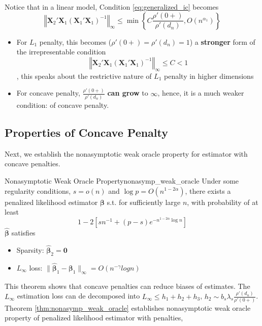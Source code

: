 \documentclass[twoside]{article}
\begin{document}
Notice that in a linear model, Condition \ref{eq:generalized_ic} becomes 
$$
\left\Vert \mathbf{X}_2' \mathbf{X}_1 \left(\mathbf{X}_1'\mathbf{X}_1\right)^{-1} \right\Vert _{\infty} \leq \min \left\{ C\frac{\rho'(0+)}{\rho'(d_n)}, O(n^{\alpha_1})\right\}
$$
\begin{itemize}
    \item For $L_1$ penalty, this becomes ($\rho'(0+)=\rho'(d_n)=1$) a \textbf{stronger} form of the irrepresentable condition $$ \left\Vert \mathbf{X}_2' \mathbf{X}_1 \left(\mathbf{X}_1'\mathbf{X}_1\right)^{-1} \right\Vert _{\infty} \leq C <1 $$, this speaks about the restrictive nature of $L_1$ penalty in higher dimensions
    \item For concave penalty, $\frac{\rho'(0+)}{\rho'(d_n)}$ \textbf{can grow} to $\infty$, hence, it is a much weaker condition:  of concave penalty.
\end{itemize}

\subsection{Properties of Concave Penalty}
Next, we establish the nonasymptotic weak oracle property for estimator with concave penalties.
\begin{theorem}{Nonasymptotic Weak Oracle Property}{nonasymp_weak_oracle}
    Under some regularity conditions, $s=o(n)$ and $\log p=O(n^{1-2\alpha})$, there exists a penalized likelihood estimator $\boldsymbol{\beta}$ s.t. for sufficiently large $n$, with probability of at least $$ 1-2\left[ sn^{-1}+(p-s)e^{-n^{1-2\alpha}\log n} \right] $$ $\hat{\boldsymbol{\beta}}$ satisfies 
    \begin{itemize}
        \item Sparsity: $\hat{\boldsymbol{\beta}}_2 =\mathbf{0}$
        \item $L_{\infty}$ loss: $\lVert \hat{\boldsymbol{\beta}}_1 -\boldsymbol{\beta}_1 \rVert _{\infty} = O(n^{-\gamma}log n)$
    \end{itemize}
\end{theorem}
This theorem shows that concave penalties can reduce biases of estimates. The $L_{\infty}$ estimation loss can de decomposed into $L_{\infty}\leq h_1 + h_2 + h_3$, $h_2 \sim b_s \lambda_s \frac{\rho'(d_n)}{\rho'(0+)}$. Theorem \ref{thm:nonasymp_weak_oracle} establishes nonasymptotic weak oracle property of penalized likelihood estimator with penalties, 
\end{document}
